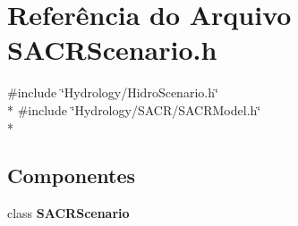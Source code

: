 \section{Referência do Arquivo S\+A\+C\+R\+Scenario.\+h}
\label{_s_a_c_r_scenario_8h}
{\ttfamily \#include \char`\"{}Hydrology/\+Hidro\+Scenario.\+h\char`\"{}}\\*
{\ttfamily \#include \char`\"{}Hydrology/\+S\+A\+C\+R/\+S\+A\+C\+R\+Model.\+h\char`\"{}}\\*
\subsection*{Componentes}
\begin{DoxyCompactItemize}
\item 
class {\bf S\+A\+C\+R\+Scenario}
\end{DoxyCompactItemize}
